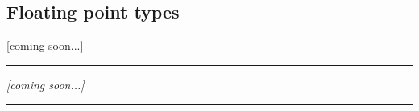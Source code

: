 
    \subsection{Floating point types}

        [coming soon...]


    \par\noindent\rule{\textwidth}{0.4pt}
    \textit{[coming soon...]}
    \par\noindent\rule{\textwidth}{0.4pt}
